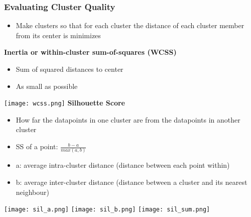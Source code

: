 \subsubsection{Evaluating Cluster Quality}
\begin{itemize}
    \item Make clusters so that for each cluster the distance of each cluster member from its center is minimizes
\end{itemize}
\textbf{Inertia or within-cluster sum-of-squares (WCSS)}
\begin{itemize}
    \item Sum of squared distances to center
    \item As small as possible
\end{itemize}
\texttt{[image: wcss.png]}
\textbf{Silhouette Score}
\begin{itemize}
    \item How far the datapoints in one cluster are from the datapoints in another cluster
    \item SS of a point: $\frac{b-a}{max(a,b)}$
    \item a: average intra-cluster distance (distance between each point within)
    \item b: average inter-cluster distance (distance between a cluster and its nearest neighbour)
\end{itemize}
\texttt{[image: sil\_a.png]}
\texttt{[image: sil\_b.png]}
\texttt{[image: sil\_sum.png]}